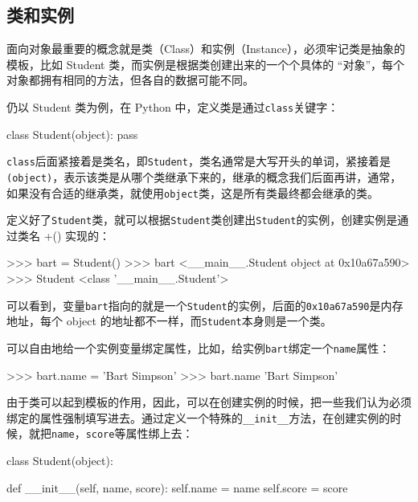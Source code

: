 \hypertarget{ux7c7bux548cux5b9eux4f8b}{%
\subsection{类和实例}\label{ux7c7bux548cux5b9eux4f8b}}

面向对象最重要的概念就是类（Class）和实例（Instance），必须牢记类是抽象的模板，比如
Student 类，而实例是根据类创建出来的一个个具体的
``对象''，每个对象都拥有相同的方法，但各自的数据可能不同。

仍以 Student 类为例，在 Python 中，定义类是通过\texttt{class}关键字：

\begin{pythoncode}
class Student(object):
    pass
\end{pythoncode}

\texttt{class}后面紧接着是类名，即\texttt{Student}，类名通常是大写开头的单词，紧接着是\texttt{(object)}，表示该类是从哪个类继承下来的，继承的概念我们后面再讲，通常，如果没有合适的继承类，就使用\texttt{object}类，这是所有类最终都会继承的类。

定义好了\texttt{Student}类，就可以根据\texttt{Student}类创建出\texttt{Student}的实例，创建实例是通过类名
+() 实现的：

\begin{pythoncode}
>>> bart = Student()
>>> bart
<__main__.Student object at 0x10a67a590>
>>> Student
<class '__main__.Student'>
\end{pythoncode}

可以看到，变量\texttt{bart}指向的就是一个\texttt{Student}的实例，后面的\texttt{0x10a67a590}是内存地址，每个
object 的地址都不一样，而\texttt{Student}本身则是一个类。

可以自由地给一个实例变量绑定属性，比如，给实例\texttt{bart}绑定一个\texttt{name}属性：

\begin{pythoncode}
>>> bart.name = 'Bart Simpson'
>>> bart.name
'Bart Simpson'
\end{pythoncode}

由于类可以起到模板的作用，因此，可以在创建实例的时候，把一些我们认为必须绑定的属性强制填写进去。通过定义一个特殊的\texttt{\_\_init\_\_}方法，在创建实例的时候，就把\texttt{name}，\texttt{score}等属性绑上去：

\begin{pythoncode}
class Student(object):

    def __init__(self, name, score):
        self.name = name
        self.score = score
\end{pythoncode}

